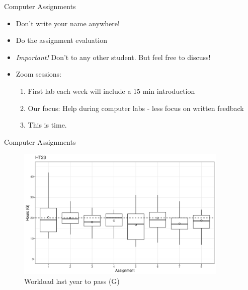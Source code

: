 \documentclass[10pt]{beamer}
\begin{document}
\begin{frame}{Computer Assignments}

\begin{itemize}
\item Don't write your name anywhere!\pause
\item Do the assignment evaluation\pause
\item \emph{Important!} Don't  to any other student. But feel free to discuss!\pause
\item Zoom sessions:
\begin{enumerate}
  \item First lab each week will include a 15 min introduction
  \item Our focus: Help during computer labs - less focus on written feedback
  \item {} This is  time.\pause
\end{enumerate}
\end{itemize}
\end{frame}


\begin{frame}{Computer Assignments}

\begin{figure}[h]
\caption{Workload last year to pass (G)}
\centering
\includegraphics[width=0.9\textwidth]{figs/G.png}
\end{figure}

\end{frame}
\end{document}
